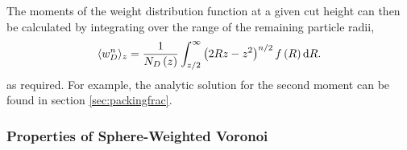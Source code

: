 The moments of the weight distribution function at a given cut height can then be calculated by integrating over the range of the remaining particle radii,
\begin{equation}
	\label{eq:wmom}
	\langle w_D^n \rangle_z = \frac{1}{N_D\left(z\right)}\int_{z/2}^\infty  \left(2Rz-z^2\right)^{n/2} f\left(R\right) \text{d} R.
\end{equation}
as required.
For example, the analytic solution for the second moment can be found in section \ref{sec:packingfrac}.


\subsubsection{Properties of Sphere\--Weighted Voronoi}

